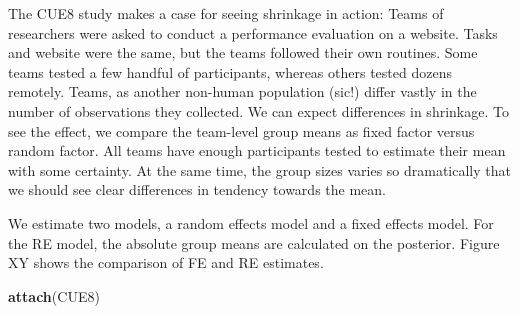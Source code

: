 \documentclass[]{svmono}
\newenvironment{Shaded}{\begin{snugshade}}{\end{snugshade}}
\newcommand{\KeywordTok}[1]{\textcolor[rgb]{0.13,0.29,0.53}{\textbf{#1}}}
\newcommand{\DataTypeTok}[1]{\textcolor[rgb]{0.13,0.29,0.53}{#1}}
\newcommand{\DecValTok}[1]{\textcolor[rgb]{0.00,0.00,0.81}{#1}}
\newcommand{\StringTok}[1]{\textcolor[rgb]{0.31,0.60,0.02}{#1}}
\newcommand{\OperatorTok}[1]{\textcolor[rgb]{0.81,0.36,0.00}{\textbf{#1}}}
\newcommand{\NormalTok}[1]{#1}
\theoremstyle{definition}
\theoremstyle{definition}
\theoremstyle{definition}
\theoremstyle{remark}
\begin{document}
The CUE8 study makes a case for seeing shrinkage in action: Teams of
researchers were asked to conduct a performance evaluation on a website.
Tasks and website were the same, but the teams followed their own
routines. Some teams tested a few handful of participants, whereas
others tested dozens remotely. Teams, as another non-human population
(sic!) differ vastly in the number of observations they collected. We
can expect differences in shrinkage. To see the effect, we compare the
team-level group means as fixed factor versus random factor. All teams
have enough participants tested to estimate their mean with some
certainty. At the same time, the group sizes varies so dramatically that
we should see clear differences in tendency towards the mean.

We estimate two models, a random effects model and a fixed effects
model. For the RE model, the absolute group means are calculated on the
posterior. Figure XY shows the comparison of FE and RE estimates.

\begin{Shaded}
\begin{Highlighting}[]
\KeywordTok{attach}\NormalTok{(CUE8)}
\end{Highlighting}
\end{Shaded}

\begin{Shaded}
\end{Shaded}
\end{document}
